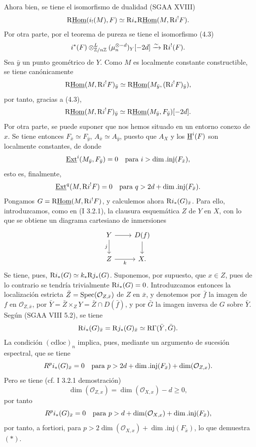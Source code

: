 Ahora bien, se tiene el isomorfismo de dualidad (SGAA XVIII)
\[
        \mathrm{R}\underline{\operatorname{Hom}}(i_!(M),F)\simeq \mathrm{R} i_*\mathrm{R}\underline{\operatorname{Hom}}(M,\mathrm{R} i^!F).
\]
Por otra parte, por el teorema de pureza se tiene el isomorfismo (4.3)
\[
        i^*(F)\otimes^L_{\mathbb{Z}/n\mathbb{Z}}(\mu_n^{\otimes -d})_Y[-2d]\xrightarrow{\sim}\mathrm{R} i^!(F).
\]
Sea $\bar{y}$ un punto geométrico de $Y$. Como $M$ es localmente constante constructible, se tiene canónicamente
\[
        \mathrm{R}\underline{\operatorname{Hom}}(M,\mathrm{R} i^!F)_{\bar{y}}\simeq \mathrm{R}\underline{\operatorname{Hom}}(M_{\bar{y}},(\mathrm{R} i^!F)_{\bar{y}}),
\]
por tanto, gracias a (4.3),
\[
        \mathrm{R}\underline{\operatorname{Hom}}(M,\mathrm{R} i^!F)_{\bar{y}}\simeq \mathrm{R}\underline{\operatorname{Hom}}(M_{\bar{y}},F_{\bar{y}})[-2d].
\]
Por otra parte, se puede suponer que nos hemos situado en un entorno conexo de $x$. Se tiene entonces $F_{\bar{x}}\simeq F_{\bar{y}}$, $A_{\bar{x}}\simeq A_{\bar{y}}$, puesto que $A_X$ y los $\underline{\mathrm H}^i(F)$ son localmente constantes, de donde
\[
        \underline{\operatorname{Ext}}^i(M_{\bar{y}},F_{\bar{y}})=0\quad\hbox{para }i>\dim.\mathrm{inj}(F_{\bar{x}}),
\]
esto es, finalmente,
\[
        \underline{\operatorname{Ext}}^{q}(M,\mathrm{R} i^!F)=0\quad\hbox{para }q>2d+\dim.\mathrm{inj}(F_{\bar{x}}).
\]
Pongamos $G=\mathrm{R}\underline{\operatorname{Hom}}(M,\mathrm{R} i^!F)$, y calculemos ahora $\mathrm{R} i_*(G)_{\bar{x}}$. Para ello, introduzcamos, como en (I 3.2.1), la clausura esquemática $Z$ de $Y$ en $X$, con lo que se obtiene un diagrama cartesiano de inmersiones
\[
\begin{tikzcd}
Y \arrow[r] \arrow[d,"j"'] & D(f) \arrow[d]\\
Z \arrow[r,"k"'] & X.
\end{tikzcd}
\]
Se tiene, pues, $\mathrm{R} i_*(G)\simeq k_*\mathrm{R} j_*(G)$. Suponemos, por supuesto, que $x\in Z$, pues de lo contrario se tendría trivialmente $\mathrm{R} i_*(G)=0$. Introduzcamos entonces la localización estricta $\bar{Z}=\operatorname{Spec}(\mathcal{O}_{Z,\bar{x}})$ de $Z$ en $\bar{x}$, y denotemos por $\bar{f}$ la imagen de $f$ en $\mathcal{O}_{Z,\bar{x}}$, por $\bar{Y}=\bar{Z}\times_ZY=\bar{Z}\cap D(\bar{f})$, y por $\bar{G}$ la imagen inversa de $G$ sobre $\bar{Y}$. Según (SGAA VIII 5.2), se tiene
\[
        \mathrm{R} i_*(G)_{\bar{x}}=\mathrm{R} j_*(G)_{\bar{x}}\simeq \mathrm{R}\Gamma(\bar{Y},\bar{G}).
\]
La condición $(\mathrm{cdloc})_n$ implica, pues, mediante un argumento de sucesión espectral, que se tiene
\[
        R^p i_*(G)_{\bar{x}}=0\quad\hbox{para }p>2d+\dim.\mathrm{inj}(F_{\bar{x}})+\dim(\mathcal{O}_{Z,x}).
\]
Pero se tiene (cf. I 3.2.1 demostración)
\[
        \dim(\mathcal{O}_{Z,x})=\dim(\mathcal{O}_{X,x})-d\geq0,
\]
por tanto
\[
        R^p i_*(G)_{\bar{x}}=0\quad\hbox{para }p>d+\dim(\mathcal{O}_{X,x})+\dim.\mathrm{inj}(F_{\bar{x}}),
\]
por tanto, a fortiori, para $p>2\dim(\mathcal{O}_{X,x})+\dim.\mathrm{inj}(F_{\bar{x}})$, lo que demuestra $(*)$.

